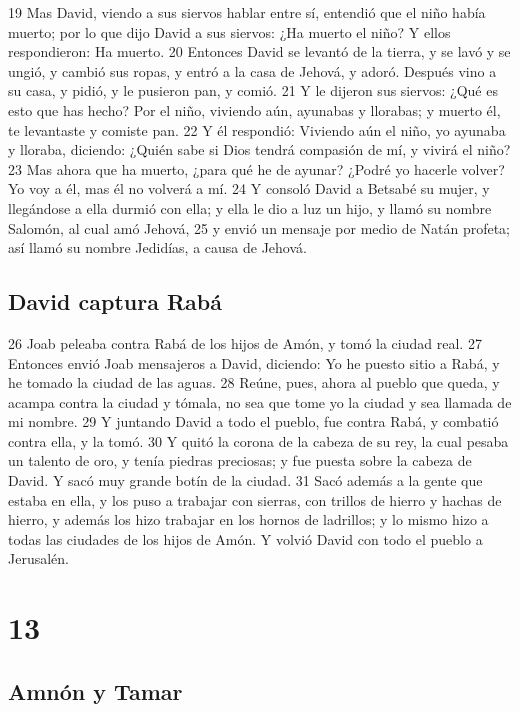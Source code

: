 19 Mas David, viendo a sus siervos hablar entre sí, entendió que el niño había muerto; por lo que dijo David a sus siervos: ¿Ha muerto el niño? Y ellos respondieron: Ha muerto.
20 Entonces David se levantó de la tierra, y se lavó y se ungió, y cambió sus ropas, y entró a la casa de Jehová, y adoró. Después vino a su casa, y pidió, y le pusieron pan, y comió.
21 Y le dijeron sus siervos: ¿Qué es esto que has hecho? Por el niño, viviendo aún, ayunabas y llorabas; y muerto él, te levantaste y comiste pan.
22 Y él respondió: Viviendo aún el niño, yo ayunaba y lloraba, diciendo: ¿Quién sabe si Dios tendrá compasión de mí, y vivirá el niño?
23 Mas ahora que ha muerto, ¿para qué he de ayunar? ¿Podré yo hacerle volver? Yo voy a él, mas él no volverá a mí.
24 Y consoló David a Betsabé su mujer, y llegándose a ella durmió con ella; y ella le dio a luz un hijo, y llamó su nombre Salomón, al cual amó Jehová,
25 y envió un mensaje por medio de Natán profeta; así llamó su nombre Jedidías, a causa de Jehová.

\section*{David captura Rabá}

26 Joab peleaba contra Rabá de los hijos de Amón, y tomó la ciudad real.
27 Entonces envió Joab mensajeros a David, diciendo: Yo he puesto sitio a Rabá, y he tomado la ciudad de las aguas.
28 Reúne, pues, ahora al pueblo que queda, y acampa contra la ciudad y tómala, no sea que tome yo la ciudad y sea llamada de mi nombre.
29 Y juntando David a todo el pueblo, fue contra Rabá, y combatió contra ella, y la tomó.
30 Y quitó la corona de la cabeza de su rey, la cual pesaba un talento de oro,  y tenía piedras preciosas; y fue puesta sobre la cabeza de David. Y sacó muy grande botín de la ciudad.
31 Sacó además a la gente que estaba en ella, y los puso a trabajar con sierras, con trillos de hierro y hachas de hierro, y además los hizo trabajar en los hornos de ladrillos; y lo mismo hizo a todas las ciudades de los hijos de Amón. Y volvió David con todo el pueblo a Jerusalén.

\chapter{13}

\section*{Amnón y Tamar}

